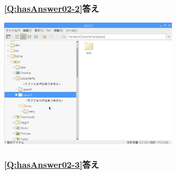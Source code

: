 \documentclass[a4paper,12pt]{jarticle}
\begin{document}
\bigskip


\bigskip


\bigskip

\subsubsection{\bfseries
\ref*{Q:hasAnswer02-2}答え}

\bigskip



\centering
\includegraphics[width=0.65\textwidth]{textbook-img213.png}
\flushleft

\clearpage\subsubsection{\bfseries
\ref*{Q:hasAnswer02-3}答え}
\end{document}
